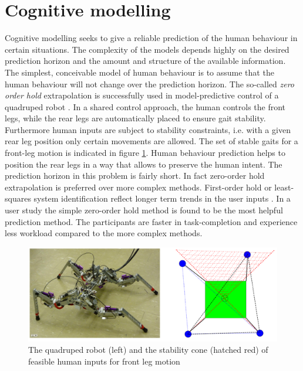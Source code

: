 \documentclass[a4paper,twoside, openright,12pt]{report}
\begin{document}
\section{Cognitive modelling}
Cognitive modelling seeks to give a reliable prediction of the human behaviour in certain situations. The complexity of the models depends highly on the desired prediction horizon and the amount and structure of the available information.\\
The simplest, conceivable model of human behaviour is to assume that the human behaviour will not change over the prediction horizon. The so-called \emph{zero order hold} extrapolation is successfully used in model-predictive control of a quadruped robot \cite{Chipalkatty2013}. In a shared control approach, the human controls the front legs, while the rear legs are automatically placed to ensure gait stability. Furthermore human inputs are subject to stability constraints, i.e. with a given rear leg position only certain movements are allowed. The set of stable gaits for a front-leg motion is indicated in figure \ref{FIG:4MPC}. Human behaviour prediction helps to position the rear legs in a way that allows to preserve the human intent. The prediction horizon in this problem is fairly short. In fact zero-order hold extrapolation is preferred over more complex methods. First-order hold or least-squares system identification reflect longer term trends in the user inputs \cite{Chipalkatty2013}. In a user study the simple zero-order hold method is found to be the most helpful prediction method. The participants are faster in task-completion and experience less workload compared to the more complex methods. 

\begin{figure}[b]
\centering
\includegraphics[width=0.7\linewidth]{4MPC.png}
\caption[Quadruped robot and the front-leg stability cone]{The quadruped robot (left) and the stability cone (hatched red) of feasible human inputs for front leg motion \cite{Chipalkatty2013}}
\label{FIG:4MPC}
\end{figure}
\end{document}
